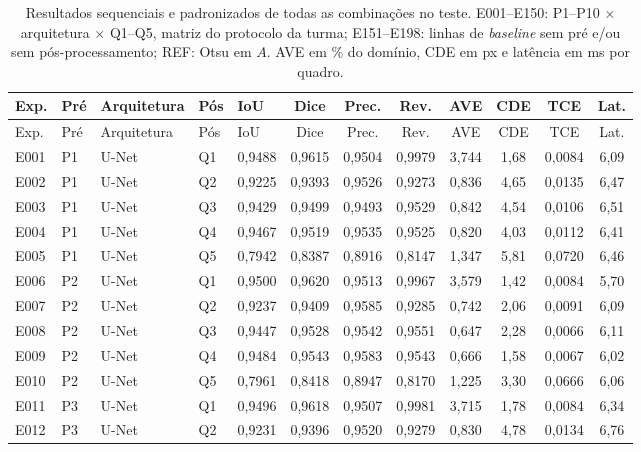 \begingroup\footnotesize
\setlength{\tabcolsep}{3.2pt}
\begin{longtable}{lllllccccccc}
\caption{Resultados sequenciais e padronizados de todas as combinações no teste. E001--E150: P1--P10 $\times$ arquitetura $\times$ Q1--Q5, matriz do protocolo da turma; E151--E198: linhas de \textit{baseline} sem pré e/ou sem pós-processamento; REF: Otsu em $A$. AVE em \% do domínio, CDE em px e latência em ms por quadro.}\label{tab:sequencial}\\
\toprule
Exp. & Pré & Arquitetura & Pós & IoU & Dice & Prec. & Rev. & AVE & CDE & TCE & Lat. \\
\midrule
\endfirsthead
\toprule
Exp. & Pré & Arquitetura & Pós & IoU & Dice & Prec. & Rev. & AVE & CDE & TCE & Lat. \\
\midrule
\endhead
\bottomrule
\endfoot
E001 & P1 & U-Net & Q1 & 0{,}9488 & 0{,}9615 & 0{,}9504 & 0{,}9979 & 3{,}744 & 1{,}68 & 0{,}0084 & 6{,}09 \\
E002 & P1 & U-Net & Q2 & 0{,}9225 & 0{,}9393 & 0{,}9526 & 0{,}9273 & 0{,}836 & 4{,}65 & 0{,}0135 & 6{,}47 \\
E003 & P1 & U-Net & Q3 & 0{,}9429 & 0{,}9499 & 0{,}9493 & 0{,}9529 & 0{,}842 & 4{,}54 & 0{,}0106 & 6{,}51 \\
E004 & P1 & U-Net & Q4 & 0{,}9467 & 0{,}9519 & 0{,}9535 & 0{,}9525 & 0{,}820 & 4{,}03 & 0{,}0112 & 6{,}41 \\
E005 & P1 & U-Net & Q5 & 0{,}7942 & 0{,}8387 & 0{,}8916 & 0{,}8147 & 1{,}347 & 5{,}81 & 0{,}0720 & 6{,}46 \\
E006 & P2 & U-Net & Q1 & 0{,}9500 & 0{,}9620 & 0{,}9513 & 0{,}9967 & 3{,}579 & 1{,}42 & 0{,}0084 & 5{,}70 \\
E007 & P2 & U-Net & Q2 & 0{,}9237 & 0{,}9409 & 0{,}9585 & 0{,}9285 & 0{,}742 & 2{,}06 & 0{,}0091 & 6{,}09 \\
E008 & P2 & U-Net & Q3 & 0{,}9447 & 0{,}9528 & 0{,}9542 & 0{,}9551 & 0{,}647 & 2{,}28 & 0{,}0066 & 6{,}11 \\
E009 & P2 & U-Net & Q4 & 0{,}9484 & 0{,}9543 & 0{,}9583 & 0{,}9543 & 0{,}666 & 1{,}58 & 0{,}0067 & 6{,}02 \\
E010 & P2 & U-Net & Q5 & 0{,}7961 & 0{,}8418 & 0{,}8947 & 0{,}8170 & 1{,}225 & 3{,}30 & 0{,}0666 & 6{,}06 \\
E011 & P3 & U-Net & Q1 & 0{,}9496 & 0{,}9618 & 0{,}9507 & 0{,}9981 & 3{,}715 & 1{,}78 & 0{,}0084 & 6{,}34 \\
E012 & P3 & U-Net & Q2 & 0{,}9231 & 0{,}9396 & 0{,}9520 & 0{,}9279 & 0{,}830 & 4{,}78 & 0{,}0134 & 6{,}76 \\

\end{longtable}
